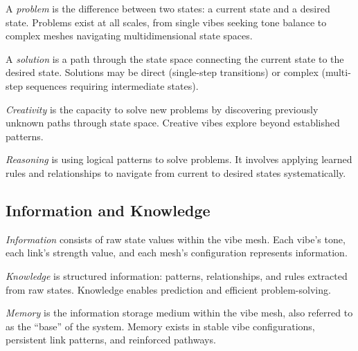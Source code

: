 \begin{definition}[Problem]
A \emph{problem} is the difference between two states: a current state and a desired state. Problems exist at all scales, from single vibes seeking tone balance to complex meshes navigating multidimensional state spaces.
\end{definition}

\begin{definition}[Solution]
A \emph{solution} is a path through the state space connecting the current state to the desired state. Solutions may be direct (single-step transitions) or complex (multi-step sequences requiring intermediate states).
\end{definition}

\begin{definition}[Creativity]
\emph{Creativity} is the capacity to solve new problems by discovering previously unknown paths through state space. Creative vibes explore beyond established patterns.
\end{definition}

\begin{definition}[Reasoning]
\emph{Reasoning} is using logical patterns to solve problems. It involves applying learned rules and relationships to navigate from current to desired states systematically.
\end{definition}

\subsection{Information and Knowledge}

\begin{definition}[Information]
\emph{Information} consists of raw state values within the vibe mesh. Each vibe's tone, each link's strength value, and each mesh's configuration represents information.
\end{definition}

\begin{definition}[Knowledge]
\emph{Knowledge} is structured information: patterns, relationships, and rules extracted from raw states. Knowledge enables prediction and efficient problem-solving.
\end{definition}

\begin{definition}[Memory]
\emph{Memory} is the information storage medium within the vibe mesh, also referred to as the ``base'' of the system. Memory exists in stable vibe configurations, persistent link patterns, and reinforced pathways.
\end{definition}

